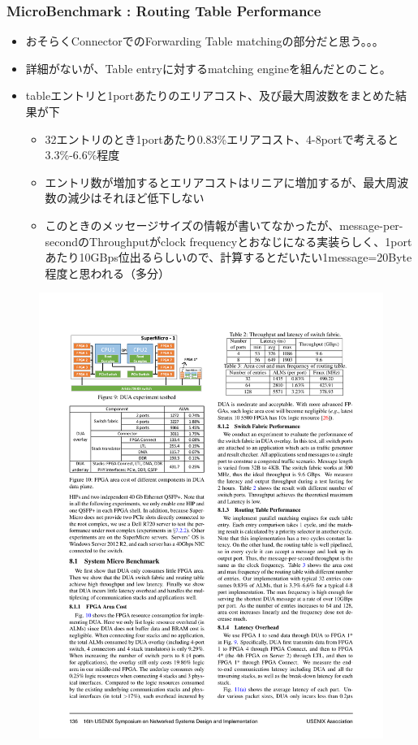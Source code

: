 \documentclass[dvipdfmx,9pt,notheorems]{beamer}
\theoremstyle{definition}
\begin{document}
\begin{frame}\frametitle{MicroBenchmark : Routing Table Performance}
	\begin{itemize}
			\item おそらくConnectorでのForwarding Table matchingの部分だと思う。。。
			\item 詳細がないが、Table entryに対するmatching engineを組んだとのこと。
			\item tableエントリと1portあたりのエリアコスト、及び最大周波数をまとめた結果が下
				\begin{itemize}
					\item 32エントリのとき1portあたり0.83\%エリアコスト、4-8portで考えると3.3\%-6.6\%程度
					\item エントリ数が増加するとエリアコストはリニアに増加するが、最大周波数の減少はそれほど低下しない
					\item このときのメッセージサイズの情報が書いてなかったが、message-per-secondのThroughputがclock frequencyとおなじになる実装らしく、1portあたり10GBps位出るらしいので、計算するとだいたい1message=20Byte程度と思われる（多分）
				\end{itemize}
	\end{itemize}
  \begin{figure}[htb]
		\includegraphics[scale=1.0]{fig/table3.pdf}
  \end{figure}
\end{frame}
\end{document}
